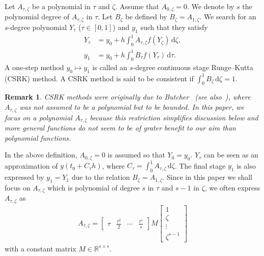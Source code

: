 \documentclass[final,leqno,onefignum,onetabnum]{siamltex1213}
\newtheorem{remark}{Remark}
\begin{document}
\begin{definition}
Let $A_{\tau,\zeta}$ be a polynomial in $\tau$ and $\zeta$.
Assume that $A_{0,\zeta}=0$.
We denote by $s$ the polynomial degree of $A_{\tau,\zeta}$ in $\tau$.
Let $B_\zeta$ be defined by $B_\zeta = A_{1,\zeta}$.
We search for an $s$-degree polynomial $Y_\tau$
($\tau\in[0,1]$) and $y_1$
such that they satisfy
\begin{align}
Y_\tau &= y_0 + h\int_0^1 A_{\tau,\zeta} f(Y_\zeta )\, {\mathrm d} \zeta, \label{CSRK1}\\
y_1 &= y_0 + h\int_0^1 B_\tau f(Y_\tau ) \,{\mathrm d} \tau . \label{CSRK2}
\end{align}
A one-step method $y_0\mapsto y_1$ is called
an $s$-degree continuous stage Runge--Kutta (CSRK) method. 
A CSRK method is said to be consistent if $\int_0^1 B_\zeta \,{\mathrm d}\zeta=1$.
\end{definition}

\begin{remark}
CSRK methods were originally due to Butcher~\cite{bu72} (see also~\cite{bu08}),
where $A_{\tau,\zeta}$ was not assumed to be a polynomial but to be bounded.
In this paper, we focus on a polynomial $A_{\tau,\zeta}$
because this restriction simplifies discussion below and more general functions
do not seem to be of grater benefit to our aim than polynomial functions.
\end{remark}

In the above definition,
$A_{0,\zeta}=0$ is assumed so that $Y_0=y_0$.
$Y_\tau$ can be seen as an approximation of $y(t_0+C_\tau h)$,
where $C_\tau = \int_0^1 A_{\tau,\zeta}\,{\mathrm d}\zeta$.
The final stage $y_1$ is also expressed by $y_1 = Y_1$ due to
the relation $B_\zeta = A_{1,\zeta}$.
Since in this paper we shall focus on $A_{\tau,\zeta}$
which is polynomial of degree $s$ in $\tau$ and $s-1$ in $\zeta$,
we often express $A_{\tau,\zeta}$ as
\begin{align}
A_{\tau,\zeta} =
\begin{bmatrix}
\tau & \frac{\tau^2}{2} & \cdots & \frac{\tau^s}{s}
\end{bmatrix}
M
\begin{bmatrix}
1 \\ \zeta \\ \vdots \\ \zeta^{s-1}
\end{bmatrix} \label{csrkm}
\end{align}
with a constant matrix $M\in\mathbb{R}^{s\times s}$.
\end{document}
